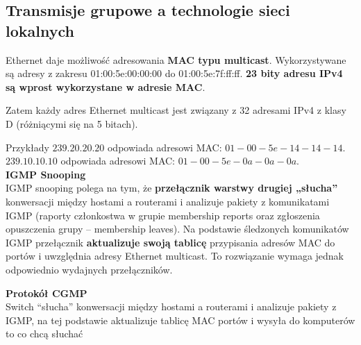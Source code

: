 \documentclass[../main.tex]{subfiles}
\begin{document}
    \subsection{Transmisje grupowe a technologie sieci lokalnych}

    Ethernet daje możliwość adresowania \textbf{MAC typu multicast}. Wykorzystywane są adresy z
    zakresu 01:00:5e:00:00:00 do 01:00:5e:7f:ff:ff. \textbf{23 bity adresu IPv4 są wprost wykorzystane w
    adresie MAC}.

    Zatem każdy adres Ethernet multicast jest związany z 32 adresami IPv4 z klasy D (różniącymi
    się na 5 bitach).

    Przykłady
    $239.20.20.20$ odpowiada adresowi MAC: $01-00-5e-14-14-14$.\\
    $239.10.10.10$ odpowiada adresowi MAC: $01-00-5e-0a-0a-0a$.\\


    \textbf{IGMP Snooping}\\
    IGMP snooping polega na tym, że \textbf{przełącznik warstwy drugiej „słucha”} konwersacji między
    hostami a routerami i analizuje pakiety z komunikatami IGMP (raporty członkostwa w grupie
    membership reports oraz zgłoszenia opuszczenia grupy – membership leaves). Na podstawie
    śledzonych komunikatów IGMP przełącznik \textbf{aktualizuje swoją tablicę} przypisania adresów
    MAC do portów i uwzględnia adresy Ethernet
    multicast.
    To rozwiązanie wymaga jednak odpowiednio wydajnych przełączników.

    \textbf{Protokół CGMP}\\
    Switch “słucha” konwersacji między hostami a routerami i analizuje pakiety z IGMP, na tej podstawie aktualizuje tablicę MAC portów i wysyła do komputerów to co chcą słuchać
\end{document}
